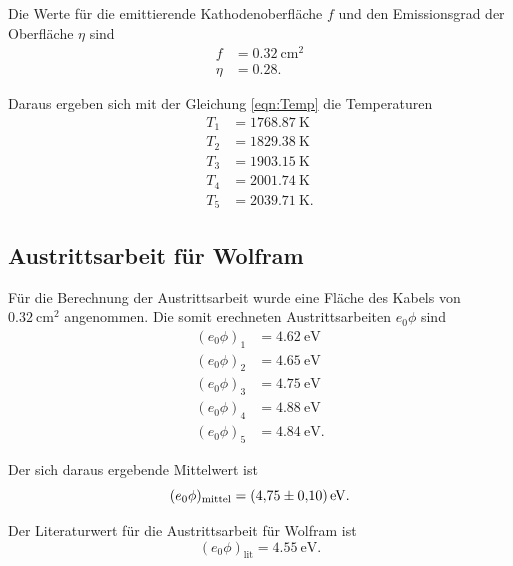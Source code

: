 \noindent Die Werte für die emittierende Kathodenoberfläche $f$ und den
Emissionsgrad der Oberfläche $\eta$ sind
\begin{align*}
    f &= \SI{0.32}{\centi\meter\squared} \\
    \eta &= \num{0.28}.
\end{align*}

\noindent Daraus ergeben sich mit der Gleichung \eqref{eqn:Temp} 
die Temperaturen
\begin{align*}
    T_\text{1} &= \SI{1768.87}{\kelvin} \\
    T_\text{2} &= \SI{1829.38}{\kelvin} \\
    T_\text{3} &= \SI{1903.15}{\kelvin} \\
    T_\text{4} &= \SI{2001.74}{\kelvin} \\
    T_\text{5} &= \SI{2039.71}{\kelvin}.
\end{align*}


\subsection{Austrittsarbeit für Wolfram}
Für die Berechnung der Austrittsarbeit wurde eine Fläche des Kabels von $\SI{0.32}{\centi\meter\squared}$ angenommen.
Die somit erechneten Austrittsarbeiten $e_0 \phi$ sind
\begin{align*}
    (e_0 \phi)_\text{1} &= \SI{4.62}{\electronvolt} \\
    (e_0 \phi)_\text{2} &= \SI{4.65}{\electronvolt} \\
    (e_0 \phi)_\text{3} &= \SI{4.75}{\electronvolt} \\
    (e_0 \phi)_\text{4} &= \SI{4.88}{\electronvolt} \\
    (e_0 \phi)_\text{5} &= \SI{4.84}{\electronvolt}.
\end{align*}

\noindent Der sich daraus ergebende Mittelwert ist
\begin{equation*}
    (e_0 \phi)_\text{mittel} = \SI{4.75 \pm 0.10}{\electronvolt}.
\end{equation*}

\noindent Der Literaturwert für die Austrittsarbeit für
Wolfram \cite{wiki} ist
\begin{equation*}
    (e_0 \phi)_\text{lit} = \SI{4.55}{\electronvolt}.
\end{equation*}

